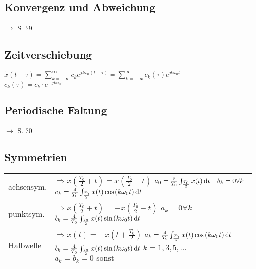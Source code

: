 \documentclass[german]{latex4ei/latex4ei_sheet}
\renewcommand{\diff}{\mathop{}\!\mathrm{\vphantom( d}}
\begin{document}
\begin{sectionbox}
		\subsection*{Konvergenz und Abweichung}
		$\rightarrow$ S. 29
		
		\subsection*{Zeitverschiebung}
		$\tilde{x}(t - \tau) = \sum\limits_{k = -\infty}^{\infty}{c_k e^{j k \omega_0 (t - \tau)}} = \sum\limits_{k = -\infty}^{\infty}{c_k(\tau) e^{j k \omega_0 t}}$\\
		$c_k(\tau) = c_k \cdot e^{-j k \omega_0 \tau}$
		
		\subsection*{Periodische Faltung}
		$\rightarrow$ S. 30
		
		\subsection*{Symmetrien}
		\begin{tabularx}{\linewidth}{p{1.5cm}X}
			achsensym. & $\Rightarrow x\left(\frac{T_0}{2} + t\right) = x\left(\frac{T_0}{2} - t\right)$ \newline $a_0 = \frac{2}{T_0} \int_{\frac{T_0}{2}}{x(t) \diff t} \quad b_k = 0 \forall k$ \newline $a_k = \frac{4}{T_0} \int_{\frac{T_0}{2}}{x(t) \cos{(k \omega_0 t)} \diff t}$ \\
			punktsym. & $\Rightarrow x\left(\frac{T_0}{2} + t\right) = -x\left(\frac{T_0}{2} - t\right)$ \newline $a_k = 0 \forall k$ \newline $b_k = \frac{4}{T_0} \int_{\frac{T_0}{2}}{x(t) \sin{(k \omega_0 t)} \diff t}$ \\
			Halbwelle & $\Rightarrow x(t) = -x\left(t + \frac{T_0}{2}\right)$ \newline $a_k = \frac{4}{T_0} \int_{\frac{T_0}{2}}{x(t) \cos{(k \omega_0 t)} \diff t}$ \newline $b_k = \frac{4}{T_0} \int_{\frac{T_0}{2}}{x(t) \sin{(k \omega_0 t)} \diff t}$ \newline $k = 1,3,5,\dots$ \newline $a_k = b_k = 0 \text{ sonst}$ \\
		\end{tabularx}
	\end{sectionbox}
\end{document}
